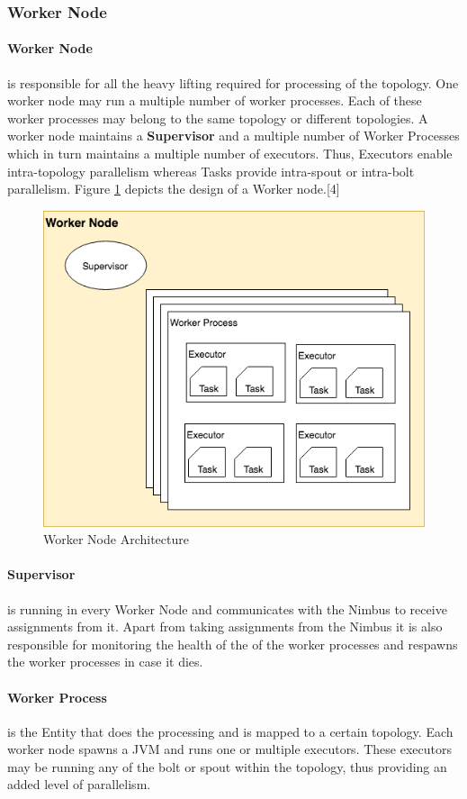 \documentclass[runningheads,a4paper]{llncs}[2015/06/24]
\begin{document}
\subsubsection{Worker Node}
\paragraph{Worker Node} is responsible for all the heavy lifting required for processing of the topology. One worker node may run a multiple number of worker processes. Each of these worker processes may belong to the same topology or different topologies. A worker node maintains a \textbf{Supervisor} and a multiple number of Worker Processes which in turn maintains a multiple number of executors. Thus, Executors enable intra-topology parallelism whereas Tasks provide intra-spout or intra-bolt parallelism. Figure \ref{fig:workerarch} depicts the design of a Worker node.[4]

\begin{figure}
  \begin{center}
    \includegraphics[width=.5\textwidth]{worker.png}
    \caption{Worker Node Architecture}
    \label{fig:workerarch}
   \end{center}
\end{figure}

\paragraph{Supervisor} is running in every Worker Node and communicates with the Nimbus to receive assignments from it. Apart from taking assignments from the Nimbus it is also responsible for monitoring the health of the of the worker processes and respawns the worker processes in case it dies.

\paragraph{Worker Process} is the Entity that does the processing and is mapped to a certain topology. Each worker node spawns a JVM and runs one or multiple executors. These executors may be running any of the bolt or spout within the topology, thus providing an added level of parallelism.
\end{document}
